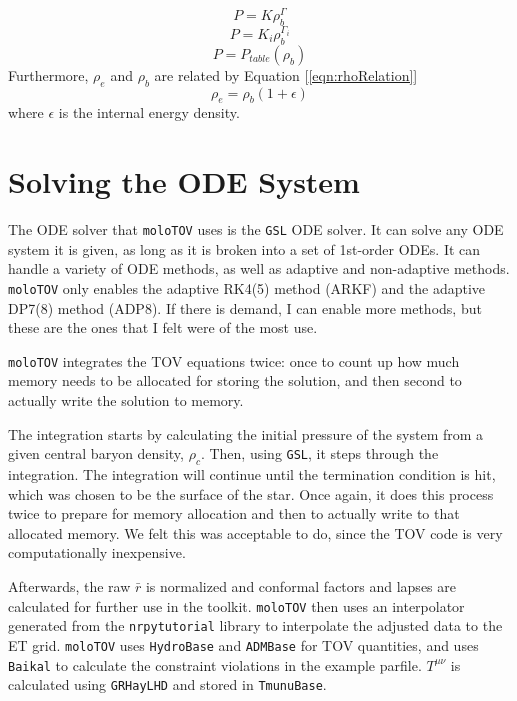 \begin{equation}\label{eqn:EOS:S}
P=K\rho_b^{\Gamma}
\end{equation}
\begin{equation}\label{eqn:EOS:P}
P=K_i\rho_b^{\Gamma_i}
\end{equation}
\begin{equation}\label{eqn:EOS:T}
P=P_{table}(\rho_b)
\end{equation}
Furthermore, $\rho_e$ and $\rho_b$ are related by Equation [\ref{eqn:rhoRelation}]
\begin{equation}\label{eqn:rhoRelation}
\rho_e = \rho_b(1+\epsilon)
\end{equation}
where $\epsilon$ is the internal energy density.

\section{Solving the ODE System}

The ODE solver that {\tt moloTOV} uses is the {\tt GSL} ODE solver. It can solve any ODE system it is given, as long as it is broken into a set of 1st-order ODEs. It can handle a variety of ODE methods, as well as adaptive and non-adaptive methods. {\tt moloTOV} only enables the adaptive RK4(5) method (ARKF) and the adaptive DP7(8) method (ADP8). If there is demand, I can enable more methods, but these are the ones that I felt were of the most use.

{\tt moloTOV} integrates the TOV equations twice: once to count up how much memory needs to be allocated for storing the solution, and then second to actually write the solution to memory. 

The integration starts by calculating the initial pressure of the system from a given central baryon density, $\rho_c$. Then, using {\tt GSL}, it steps through the integration. The integration will continue until the termination condition is hit, which was chosen to be the surface of the star. Once again, it does this process twice to prepare for memory allocation and then to actually write to that allocated memory. We felt this was acceptable to do, since the TOV code is very computationally inexpensive.

Afterwards, the raw $\bar{r}$ is normalized and conformal factors and lapses are calculated for further use in the toolkit. {\tt moloTOV} then uses an interpolator generated from the {\tt nrpytutorial}\cite{NRpy} library to interpolate the adjusted data to the ET grid. {\tt moloTOV} uses {\tt HydroBase} and {\tt ADMBase} for TOV quantities, and uses {\tt Baikal} to calculate the constraint violations in the example parfile. $T^{\mu\nu}$ is calculated using {\tt GRHayLHD} and stored in {\tt TmunuBase}.

